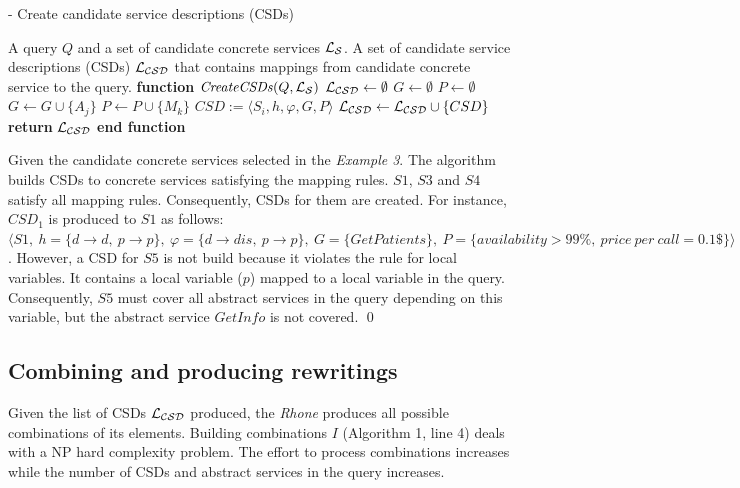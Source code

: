 \begin{algorithm}[h!]
\caption{ - Create candidate service descriptions (CSDs)}
\label{creatingcsds}
\begin{algorithmic}[1]
\REQUIRE A query $Q$ and a set of candidate concrete services $\hbox{${\cal L_{S}}$}$.
\ENSURE A set of candidate service descriptions (CSDs) $\hbox{${\cal L_{CSD}}$}$ that contains mappings from candidate concrete service to the query.
\STATE \textbf{function} $\mathit{CreateCSDs} (Q, \hbox{${\cal L_{S}}$})$
\STATE $\hbox{${\cal L_{CSD}}$} \leftarrow \emptyset$
		\STATE $G \leftarrow \emptyset$	
		\STATE $P \leftarrow \emptyset$		
			\STATE $G \leftarrow G \cup \lbrace A_{j} \rbrace$ 
		\ENDFOR
			\STATE $P \leftarrow P \cup \lbrace M_{k} \rbrace$ 
		\ENDFOR
		\STATE $CSD := \langle S_{i}, h, \varphi, G, P \rangle$	
		\STATE $\hbox{${\cal L_{CSD}}$} \leftarrow \hbox{${\cal L_{CSD}}$} \cup \lbrace CSD \rbrace$	
	\ENDIF
\ENDFOR
\STATE \textbf{return} $\hbox{${\cal L_{CSD}}$}$
\STATE \textbf{end function}
\end{algorithmic}
\end{algorithm}

\begin{example}%
Given the candidate concrete services selected in the \textit{Example 3}. The algorithm builds CSDs to concrete services satisfying the mapping rules. $S1$, $S3$ and $S4$ satisfy all mapping rules. Consequently, CSDs for them are created. For instance, $CSD_{1}$ is produced to $S1$ as follows: 
$\langle S1, \ h = \lbrace d \rightarrow d, \ p \rightarrow p \rbrace, \ \varphi = \lbrace d \rightarrow dis, \ p \rightarrow p \rbrace, \ G = \lbrace GetPatients \rbrace, \ P = \lbrace availability > 99\%, \ price \ per \ call = 0.1\$ \rbrace \rangle$. However, a CSD for $S5$ is not build because it violates the rule for local variables. It contains a local variable ($p$) mapped to a local variable in the query. Consequently, $S5$ must cover all abstract services in the query depending on this variable, but the abstract service $GetInfo$ is not covered.
\qed
\end{example}
 

\subsection{Combining and producing rewritings}
Given the list of CSDs $\hbox{${\cal L_{CSD}}$}$ produced, the \textit{Rhone} produces all possible combinations of its elements. 
Building combinations $I$ (Algorithm 1, line 4) deals with a NP hard complexity problem.
The effort to process combinations increases while the number of CSDs and abstract services in the query increases.

